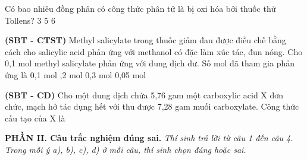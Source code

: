 \documentclass[12pt,a4paper]{article}
\begin{document}
\begin{ex}
Có bao nhiêu đồng phân có công thức phân tử là  bị oxi hóa bởi thuốc thử Tollens?
\choice
{3}
{}
{5}
{6}

\end{ex}

\begin{ex}
\textbf{(SBT - CTST)} Methyl salicylate trong thuốc giảm đau được điều chế bằng cách cho salicylic acid phản ứng với methanol có  đặc làm xúc tác, đun nóng. Cho 0,1 mol methyl salicylate phản ứng với dung dịch  dư. Số mol  đã tham gia phản ứng là
\choice
{0,1 mol}
{,2 mol}
{0,3 mol}
{0,05 mol}

\end{ex}

\begin{ex}
\textbf{(SBT - CD)} Cho một dung dịch chứa 5,76 gam một carboxylic acid X đơn chức, mạch hở tác dụng hết với  thu được 7,28 gam muối carboxylate. Công thức cấu tạo của X là
\choice
{\True {}}
{}
{}
{}

\end{ex}

\bigskip
\noindent\textbf{\large PHẦN II. Câu trắc nghiệm đúng sai.}
\textit{Thí sinh trả lời từ câu 1 đến câu 4. Trong mỗi ý a), b), c), d) ở mỗi câu, thí sinh chọn đúng hoặc sai.}
\vspace{0.2cm}
\end{document}
